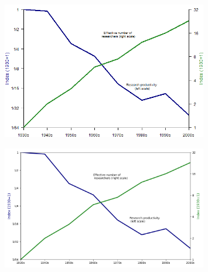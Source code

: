 \documentclass[11pt]{amsart}
\begin{document}
\noindent

\smallskip

\newpage


\smallskip

\begin{figure}[h]
    \centering 
    \includegraphics[width=0.8\textwidth]{main_result_r.png}  
    \label{fig:histogram} 
\end{figure}

\noindent

\bigskip


\smallskip

\begin{figure}[h]
    \centering 
    \includegraphics[width=0.8\textwidth]{main_result_python.png}  
    \label{fig:histogram} 
\end{figure}

\noindent
\end{document}
